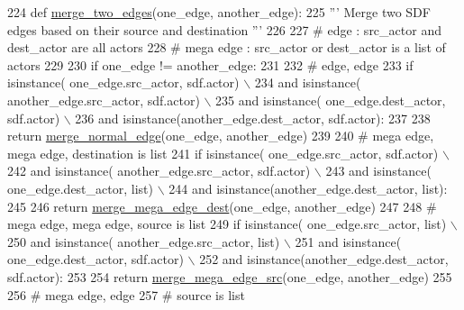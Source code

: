 \begin{DoxyCode}
224   \textcolor{keyword}{def }\hyperlink{namespacesylva_1_1glic_1_1glic_a3230a4ec28a3787a073288b4532675cc}{merge\_two\_edges}(one\_edge, another\_edge):
225     \textcolor{stringliteral}{''' Merge two SDF edges based on their source and destination '''}
226 
227     \textcolor{comment}{# edge : src\_actor and dest\_actor are all actors}
228     \textcolor{comment}{# mega edge : src\_actor or dest\_actor is a list of actors}
229 
230     \textcolor{keywordflow}{if} one\_edge != another\_edge:
231 
232       \textcolor{comment}{# edge, edge}
233       \textcolor{keywordflow}{if} isinstance( one\_edge.src\_actor, sdf.actor) \(\backslash\)
234               \textcolor{keywordflow}{and} isinstance( another\_edge.src\_actor, sdf.actor) \(\backslash\)
235               \textcolor{keywordflow}{and} isinstance( one\_edge.dest\_actor, sdf.actor) \(\backslash\)
236               \textcolor{keywordflow}{and} isinstance(another\_edge.dest\_actor, sdf.actor):
237 
238         \textcolor{keywordflow}{return} \hyperlink{namespacesylva_1_1glic_1_1glic_a1d03fa1322fc331579ff650ea5612ce8}{merge\_normal\_edge}(one\_edge, another\_edge)
239 
240       \textcolor{comment}{# mega edge, mega edge, destination is list}
241       \textcolor{keywordflow}{if} isinstance( one\_edge.src\_actor, sdf.actor) \(\backslash\)
242               \textcolor{keywordflow}{and} isinstance( another\_edge.src\_actor, sdf.actor) \(\backslash\)
243               \textcolor{keywordflow}{and} isinstance( one\_edge.dest\_actor, list) \(\backslash\)
244               \textcolor{keywordflow}{and} isinstance(another\_edge.dest\_actor, list):
245 
246         \textcolor{keywordflow}{return} \hyperlink{namespacesylva_1_1glic_1_1glic_a80e6906ee9b3a3c96085594f6dab2f84}{merge\_mega\_edge\_dest}(one\_edge, another\_edge)
247 
248       \textcolor{comment}{# mega edge, mega edge, source is list}
249       \textcolor{keywordflow}{if} isinstance( one\_edge.src\_actor, list) \(\backslash\)
250               \textcolor{keywordflow}{and} isinstance( another\_edge.src\_actor, list) \(\backslash\)
251               \textcolor{keywordflow}{and} isinstance( one\_edge.dest\_actor, sdf.actor) \(\backslash\)
252               \textcolor{keywordflow}{and} isinstance(another\_edge.dest\_actor, sdf.actor):
253 
254         \textcolor{keywordflow}{return} \hyperlink{namespacesylva_1_1glic_1_1glic_aa4a9eb6227bd109eec96e5c1ad6579c5}{merge\_mega\_edge\_src}(one\_edge, another\_edge)
255 
256       \textcolor{comment}{# mega edge, edge}
257       \textcolor{comment}{# source is list}

\end{DoxyCode}
